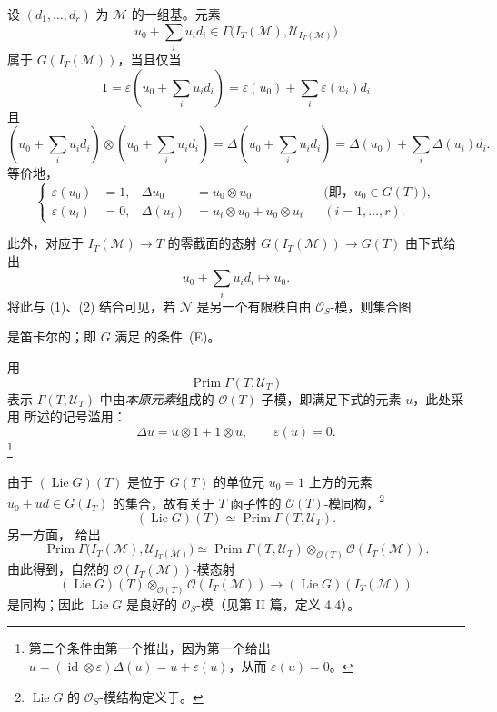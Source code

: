 设 \((d_1,\ldots,d_r)\) 为 \(\mathcal M\) 的一组基。元素
\[
  u_0+\sum_i u_i d_i
  \in
  \Gamma\bigl(I_T(\mathcal M),\mathcal U_{I_T(\mathcal M)}\bigr)
\]
属于 \(G(I_T(\mathcal M))\)，当且仅当
\[
  1
  =\varepsilon\left(u_0+\sum_i u_i d_i\right)
  =\varepsilon(u_0)+\sum_i\varepsilon(u_i)d_i
\]
且
\[
  \left(u_0+\sum_i u_i d_i\right)
  \otimes
  \left(u_0+\sum_i u_i d_i\right)
  =
  \Delta\left(u_0+\sum_i u_i d_i\right)
  =
  \Delta(u_0)+\sum_i\Delta(u_i)d_i.
\]
等价地，
\begin{equation}
  \left\{
  \begin{aligned}
    \varepsilon(u_0)&=1,&
    \Delta u_0&=u_0\otimes u_0
      &&\bigl(\text{即，}u_0\in G(T)\bigr),\\
    \varepsilon(u_i)&=0,&
    \Delta(u_i)&=u_i\otimes u_0+u_0\otimes u_i
      &&(i=1,\ldots,r).
  \end{aligned}
  \right.
  \tag{2}
  \label{sga3:VIIA:3.2.3-eq2}
\end{equation}

此外，对应于 \(I_T(\mathcal M)\to T\) 的零截面的态射 \(G(I_T(\mathcal M))\to G(T)\) 由下式给出
\[
  u_0+\sum_i u_i d_i\longmapsto u_0.
\]
将此与 (1)、(2) 结合可见，若 \(\mathcal N\) 是另一个有限秩自由 \(\mathcal O_S\)-模，则集合图
\begin{center}
  \label{sga3:VIIA:3.2.3-condition-E-square}
  
\end{center}
是笛卡尔的；即 \(G\) 满足 的条件~(E)。

用
\[
  \operatorname{Prim}\Gamma(T,\mathcal U_T)
\]
表示 \(\Gamma(T,\mathcal U_T)\) 中由\emph{本原元素}组成的 \(\mathcal O(T)\)-子模，即满足下式的元素 \(u\)，此处采用  所述的记号滥用：
\[
  \Delta u=u\otimes1+1\otimes u,
  \qquad
  \varepsilon(u)=0.
\]
\footnote{第二个条件由第一个推出，因为第一个给出 \(u=(\operatorname{id}\otimes\varepsilon)\Delta(u)
=u+\varepsilon(u)\)，从而 \(\varepsilon(u)=0\)。}

由于 \((\operatorname{Lie}G)(T)\) 是位于 \(G(T)\) 的单位元 \(u_0=1\) 上方的元素 \(u_0+ud\in G(I_T)\) 的集合，故有关于 \(T\) 函子性的 \(\mathcal O(T)\)-模同构，\footnote{\(\operatorname{Lie}G\) 的 \(\mathcal O_S\)-模结构定义于。}
\[
  (\operatorname{Lie}G)(T)
  \simeq
  \operatorname{Prim}\Gamma(T,\mathcal U_T).
\]
另一方面， 给出
\[
  \operatorname{Prim}
    \Gamma\bigl(I_T(\mathcal M),
      \mathcal U_{I_T(\mathcal M)}\bigr)
  \simeq
  \operatorname{Prim}\Gamma(T,\mathcal U_T)
  \otimes_{\mathcal O(T)}\mathcal O(I_T(\mathcal M)).
\]
由此得到，自然的 \(\mathcal O(I_T(\mathcal M))\)-模态射
\[
  (\operatorname{Lie}G)(T)
  \otimes_{\mathcal O(T)}\mathcal O(I_T(\mathcal M))
  \longrightarrow
  (\operatorname{Lie}G)(I_T(\mathcal M))
\]
是同构；因此 \(\operatorname{Lie}G\) 是良好的 \(\mathcal O_S\)-模（见第 II 篇，定义 4.4）。


